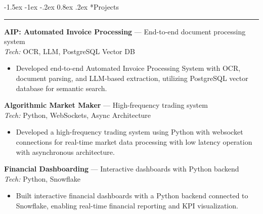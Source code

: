 \documentclass[10pt,letterpaper]{article}
\makeatletter
\renewcommand{\section}{\@startsection{section}{1}{\z@}%
  {-1.5ex \@plus -1ex \@minus -.2ex}%
  {0.8ex \@plus.2ex}%
  {\normalfont\large\bfseries}}
\makeatother
\begin{document}
\section*{Projects}
\hrule\vspace{0.3em}

\textbf{AIP: Automated Invoice Processing} — End-to-end document processing system \hfill \\
\emph{Tech:} OCR, LLM, PostgreSQL Vector DB\vspace{-0.2em}
\begin{itemize}
  \item Developed end-to-end Automated Invoice Processing System with OCR, document parsing, and LLM-based extraction, utilizing PostgreSQL vector database for semantic search.
\end{itemize}

\textbf{Algorithmic Market Maker} — High-frequency trading system \hfill \\
\emph{Tech:} Python, WebSockets, Async Architecture\vspace{-0.2em}
\begin{itemize}
  \item Developed a high-frequency trading system using Python with websocket connections for real-time market data processing with low latency operation with asynchronous architecture.
\end{itemize}

\textbf{Financial Dashboarding} — Interactive dashboards with Python backend \hfill \\
\emph{Tech:} Python, Snowflake\vspace{-0.2em}
\begin{itemize}
  \item Built interactive financial dashboards with a Python backend connected to Snowflake, enabling real-time financial reporting and KPI visualization.
\end{itemize}
\end{document}
